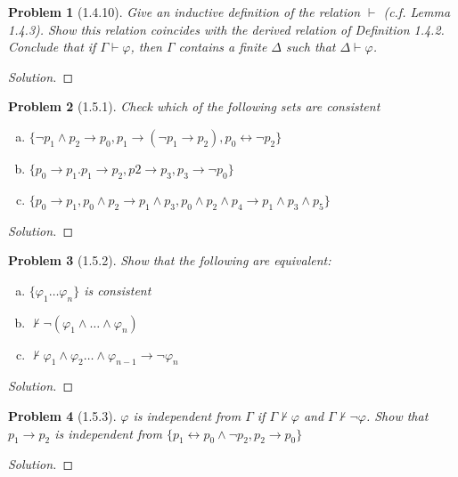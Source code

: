 \documentclass[letter]{article}
\newtheorem{problem}{Problem}
\theoremstyle{definition}
\newenvironment{solution}
{\begin{proof}[Solution]}
	{\end{proof}}
\renewcommand{\phi}{\varphi}
\begin{document}
\begin{problem}[1.4.10] Give an inductive definition of the relation $\vdash$ (c.f. Lemma 1.4.3). Show this relation coincides with the derived relation of Definition 1.4.2. Conclude that if $\Gamma \vdash \phi$, then $\Gamma$ contains a finite $\Delta$ such that $\Delta \vdash \phi$.
\end{problem}
\begin{solution}
\end{solution}


\begin{problem}[1.5.1] Check which of the following sets are consistent
    \begin{enumerate}[(a)]
        \item $\{\neg p_1 \land p_2 \to p_0, p_1 \to (\neg p_1 \to p_2), p_0 \leftrightarrow \neg p_2\}$
        \item $\{p_0 \to p_1. p_1 \to p_2, p2 \to p_3, p_3 \to \neg p_0\}$
        \item $\{p_0 \to p_1, p_0 \land p_2 \to p_1 \land p_3, p_0 \land p_2 \land p_4 \to p_1 \land p_3 \land p_5 \}$
    \end{enumerate}
\end{problem}
\begin{solution}
\end{solution}

\begin{problem}[1.5.2] Show that the following are equivalent:
    \begin{enumerate}[(a)]
        \item $\{\phi_1 \ldots \phi_n\}$ is consistent
        \item $\not \vdash \neg (\phi_1 \land \ldots \land \phi_n)$
        \item $\not \vdash \phi_1 \land \phi_2 \ldots \land \phi_{n-1}\to \neg \phi_n$
    \end{enumerate}
\end{problem}
\begin{solution}
\end{solution}

\begin{problem}[1.5.3] $\phi$ is \textit{independent} from $\Gamma$ if
    $\Gamma \not \vdash \phi$ and $\Gamma \not \vdash \neg \phi$. Show that $p_1 \to p_2$ is independent from $\{p_1 \leftrightarrow p_0 \land \neg p_2, p_2 \to p_0\}$
\end{problem}
\begin{solution}
\end{solution}
\end{document}
